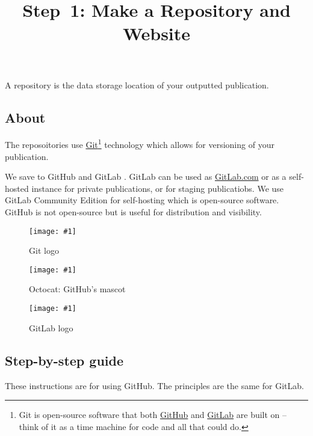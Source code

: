 \documentclass{article}
\newlength{\imgwidth}
\newcommand\scaledgraphics[2]{%
                
\settowidth{\imgwidth}{\texttt{[image: \#1]}}%
                
\setlength{\imgwidth}{\minof{\imgwidth}{#2\textwidth}}%
                
\texttt{[image: \#1]}%
                
}
\begin{document}
\title{Step 1: Make a Repository and Website}

\maketitle


A repository is the data storage location of your outputted publication.


\subsection{About}\label{H4018151}



The reposoitories use \href{https://git-scm.com/}{Git}\footnote{Git is open-source software that both \href{https://github.com/}{GitHub} and \href{https://about.gitlab.com/}{GitLab} are built on – think of it as a time machine for code and all that could do.} technology which allows for versioning of your publication.


We save to GitHub and GitLab \autocite{PerkelJeffrey2016}. GitLab can be used as \href{GitLab.com}{GitLab.com} or as a self-hosted instance for private publications, or for staging publicatiobs. We use GitLab Community Edition for self-hosting which is open-source software. GitHub is not open-source but is useful for distribution and visibility.

\begin{figure}
\scaledgraphics{26972b81-3aa5-42db-9da6-7ab6ab269dc3.jpg}{0.5}
\caption*{Git logo}\label{F22345641}
\end{figure}

\begin{figure}
\scaledgraphics{db781e4a-0460-4824-8351-05102a800d4e.jpg}{0.5}
\caption*{Octocat: GitHub's mascot}\label{F44428261}
\end{figure}

\begin{figure}
\scaledgraphics{6c70c3fd-31ab-446b-bfe3-5a7ee1e2f98f.png}{0.5}
\caption*{GitLab logo}\label{F88034391}
\end{figure}


\subsection{Step-by-step guide}\label{H1473428}



These instructions are for using GitHub. The principles are the same for GitLab.
\end{document}
